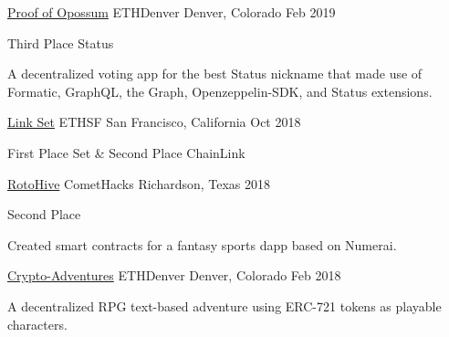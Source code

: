 
\begin{cventries}

	\cventry
	{\href{https://github.com/Emiller88/proof-of-opossum}{Proof of Opossum}} %
	{ETHDenver} %
	{Denver, Colorado} %
	{Feb 2019} %
	{
		\begin{cvitems} %
			\item {Third Place Status}
			\item {A decentralized voting app for the best Status nickname that
					made use of Formatic, GraphQL, the Graph, Openzeppelin-SDK, and
					Status extensions.}
		\end{cvitems}
	}

	\cventry
	{\href{https://github.com/Emiller88/Link-Set}{Link Set}} %
	{ETHSF} %
	{San Francisco, California} %
	{Oct 2018} %
	{
		\begin{cvitems} %
			\item {First Place Set \& Second Place ChainLink}
		\end{cvitems}
	}

	\cventry
	{\href{https://github.com/Emiller88/Rotohive}{RotoHive}} %
	{CometHacks} %
	{Richardson, Texas} %
	{2018} %
	{
		\begin{cvitems} %
			\item {Second Place}
			\item {Created smart contracts for a fantasy sports dapp based on Numerai.}
		\end{cvitems}
	}

	\cventry
	{\href{https://github.com/Crypto-Adventures}{Crypto-Adventures}} %
	{ETHDenver} %
	{Denver, Colorado} %
	{Feb 2018} %
	{
		\begin{cvitems} %
			\item {A decentralized RPG text-based adventure using ERC-721 tokens
					as playable characters.}
		\end{cvitems}
	}


\end{cventries}
